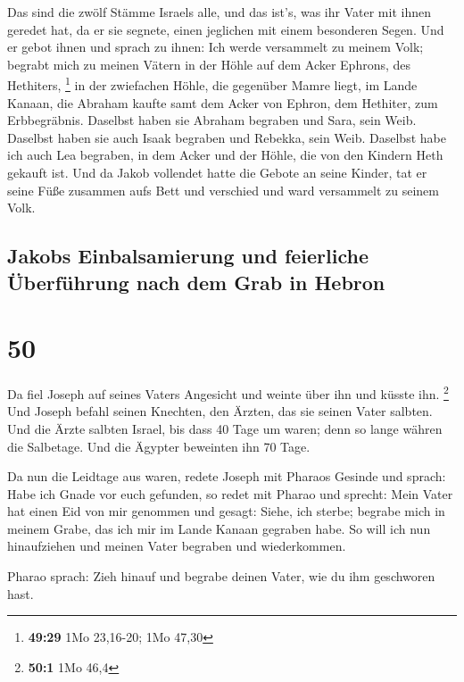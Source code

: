  Das sind die zwölf Stämme Israels alle, und das ist's,
was ihr Vater mit ihnen geredet hat, da er sie segnete, einen jeglichen
mit einem besonderen Segen.  Und er gebot ihnen und
sprach zu ihnen: Ich werde versammelt zu meinem Volk; begrabt mich zu
meinen Vätern in der Höhle auf dem Acker Ephrons, des Hethiters,
\footnote{\textbf{49:29} 1Mo 23,16-20; 1Mo 47,30}  in der
zwiefachen Höhle, die gegenüber Mamre liegt, im Lande Kanaan, die
Abraham kaufte samt dem Acker von Ephron, dem Hethiter, zum
Erbbegräbnis.  Daselbst haben sie Abraham begraben und
Sara, sein Weib. Daselbst haben sie auch Isaak begraben und Rebekka,
sein Weib. Daselbst habe ich auch Lea begraben,  in dem
Acker und der Höhle, die von den Kindern Heth gekauft ist.
 Und da Jakob vollendet hatte die Gebote an seine Kinder,
tat er seine Füße zusammen aufs Bett und verschied und ward versammelt
zu seinem Volk.

\hypertarget{jakobs-einbalsamierung-und-feierliche-uxfcberfuxfchrung-nach-dem-grab-in-hebron}{%
\subsection{Jakobs Einbalsamierung und feierliche Überführung nach dem
Grab in
Hebron}\label{jakobs-einbalsamierung-und-feierliche-uxfcberfuxfchrung-nach-dem-grab-in-hebron}}

\hypertarget{section-49}{%
\section{50}\label{section-49}}

 Da fiel Joseph auf seines Vaters Angesicht und weinte
über ihn und küsste ihn. \footnote{\textbf{50:1} 1Mo 46,4}
 Und Joseph befahl seinen Knechten, den Ärzten, das sie
seinen Vater salbten. Und die Ärzte salbten Israel,  bis
dass 40 Tage um waren; denn so lange währen die Salbetage. Und die
Ägypter beweinten ihn 70 Tage.

 Da nun die Leidtage aus waren, redete Joseph mit Pharaos
Gesinde und sprach: Habe ich Gnade vor euch gefunden, so redet mit
Pharao und sprecht:  Mein Vater hat einen Eid von mir
genommen und gesagt: Siehe, ich sterbe; begrabe mich in meinem Grabe,
das ich mir im Lande Kanaan gegraben habe. So will ich nun hinaufziehen
und meinen Vater begraben und wiederkommen.

 Pharao sprach: Zieh hinauf und begrabe deinen Vater, wie
du ihm geschworen hast.

